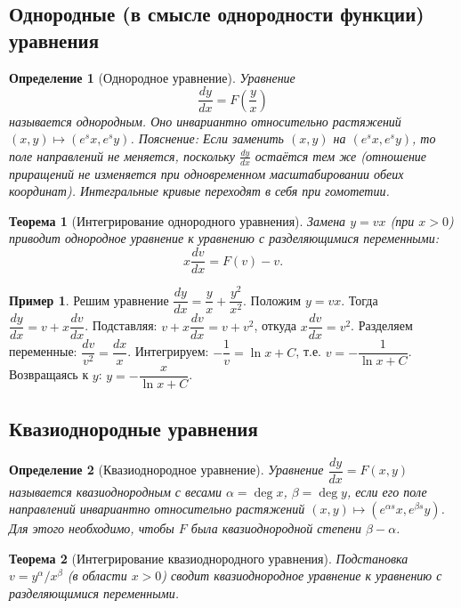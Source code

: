 \documentclass[a4paper,12pt]{article}
\newtheorem{definition}{Определение}
\newtheorem{theorem}{Теорема}
\theoremstyle{definition}
\newtheorem{example}{Пример}
\begin{document}
\subsection{Однородные (в смысле однородности функции) уравнения}

\begin{definition}[Однородное уравнение]
	Уравнение
	\[
	\frac{dy}{dx}=F\!\left(\frac{y}{x}\right)
	\]
	называется \emph{однородным}. Оно инвариантно относительно растяжений $(x,y)\mapsto(e^s x,e^s y)$.
	\emph{Пояснение:} Если заменить $(x,y)$ на $(e^s x, e^s y)$, то поле направлений не меняется, поскольку $\frac{dy}{dx}$ остаётся тем же (отношение приращений не изменяется при одновременном масштабировании обеих координат). Интегральные кривые переходят в себя при гомотетии.
\end{definition}

\begin{theorem}[Интегрирование однородного уравнения]
	Замена $y=vx$ (при $x>0$) приводит однородное уравнение к уравнению с разделяющимися переменными:
	\[
	x\frac{dv}{dx}=F(v)-v.
	\]
\end{theorem}

\begin{example}
	Решим уравнение $\dfrac{dy}{dx}=\dfrac{y}{x}+\dfrac{y^2}{x^2}$.
	Положим $y=vx$. Тогда $\dfrac{dy}{dx}=v+x\dfrac{dv}{dx}$. Подставляя: $v+x\dfrac{dv}{dx}=v+v^2$, откуда $x\dfrac{dv}{dx}=v^2$.
	Разделяем переменные: $\dfrac{dv}{v^2}=\dfrac{dx}{x}$. Интегрируем: $-\dfrac{1}{v}=\ln x+C$, т.е. $v=-\dfrac{1}{\ln x+C}$. Возвращаясь к $y$: $y=-\dfrac{x}{\ln x+C}$.
\end{example}

\subsection{Квазиоднородные уравнения}

\begin{definition}[Квазиоднородное уравнение]
	Уравнение $\dfrac{dy}{dx}=F(x,y)$ называется \emph{квазиоднородным} с весами $\alpha=\deg x$, $\beta=\deg y$, если его поле направлений инвариантно относительно растяжений $(x,y)\mapsto(e^{\alpha s}x,e^{\beta s}y)$.
	Для этого необходимо, чтобы $F$ была квазиоднородной степени $\beta-\alpha$.
\end{definition}

\begin{theorem}[Интегрирование квазиоднородного уравнения]
	Подстановка $v=y^\alpha/x^\beta$ (в области $x>0$) сводит квазиоднородное уравнение к уравнению с разделяющимися переменными.
\end{theorem}
\end{document}
